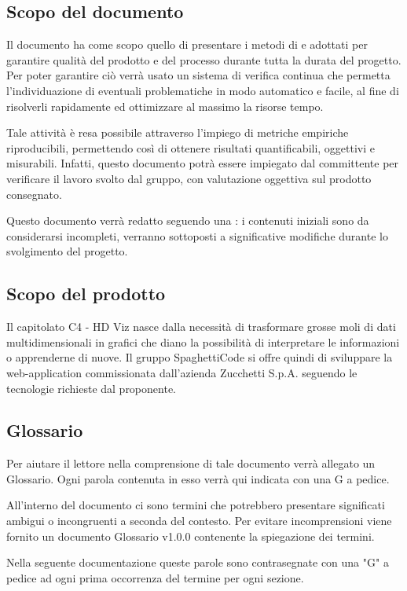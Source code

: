 \documentclass[../piano_di_qualifica.tex]{subfiles}
\begin{document}
\subsection{Scopo del documento}
Il documento ha come scopo quello di presentare i metodi di  e  adottati per garantire qualità del prodotto e del processo durante tutta la durata del progetto. Per poter garantire ciò verrà usato un sistema di verifica continua che permetta l'individuazione di eventuali problematiche in modo automatico e facile, al fine di risolverli rapidamente ed ottimizzare al massimo la risorse tempo.

Tale attività è resa possibile attraverso l’impiego di metriche empiriche riproducibili, permettendo così di ottenere risultati quantificabili, oggettivi e misurabili. Infatti, questo documento potrà essere impiegato dal committente per verificare il lavoro svolto dal gruppo, con valutazione oggettiva sul prodotto consegnato.

Questo documento verrà redatto seguendo una : i contenuti iniziali sono da considerarsi incompleti, verranno sottoposti a significative modifiche  durante lo svolgimento del progetto.

\subsection{Scopo del prodotto}
Il capitolato C4 - HD Viz nasce dalla necessità di trasformare grosse moli di dati multidimensionali in grafici che diano la possibilità di interpretare le informazioni o apprenderne di nuove. Il gruppo SpaghettiCode si offre quindi di sviluppare la web-application commissionata dall’azienda Zucchetti S.p.A. seguendo le tecnologie richieste dal proponente.

\subsection{Glossario}
Per aiutare il lettore nella comprensione di tale documento verrà allegato un Glossario. Ogni parola contenuta in esso verrà qui indicata con una G a pedice.

All'interno del documento ci sono termini che potrebbero presentare significati ambigui o incongruenti a seconda del contesto. Per evitare incomprensioni viene fornito un documento Glossario v1.0.0 contenente la spiegazione dei termini.

Nella seguente documentazione queste parole sono contrasegnate con una "G" a pedice ad ogni prima occorrenza del termine per ogni sezione.
\end{document}
